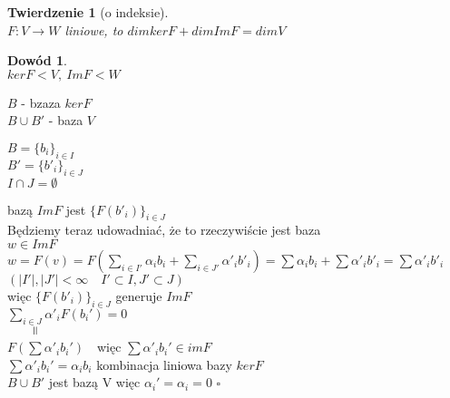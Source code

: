 \documentclass[12pt,a4paper]{article}
\renewcommand{\qed}{$\square$}
\theoremstyle{plain}
\newtheorem{tw}{Twierdzenie}[section]
\theoremstyle{definition}
\theoremstyle{definition}
\theoremstyle{definition}
\theoremstyle{definition}
\newtheorem*{dd}{Dowód}
\theoremstyle{definition}
\theoremstyle{definition}
\theoremstyle{definition}
\theoremstyle{definition}
\theoremstyle{definition}
\begin{document}
\begin{tw}[o indeksie]
    ~\\
    $F: V \rightarrow W $ liniowe, to $dimker F + dimIm F = dim V$
\end{tw}
\newpage
\begin{dd}
    ~\\
    $ker F < V,\  Im F < W$ \\
    \begin{minipage}[c]{0.5\textwidth}
        $B$ - bzaza $ker F$ \\
        $ B \cup B' $ - baza $V$
    \end{minipage}%
    \begin{minipage}[c]{0.5\textwidth}
        $B = \{b_i\}_{i \in I}$ \\
        $B' = \{b'_i\}_{i \in J}$ \\
        $I \cap J = \emptyset $
    \end{minipage}
    bazą $Im F$ jest $\{F(b'_i)\}_{i \in J}$ \\
    Będziemy teraz udowadniać, że to rzeczywiście jest baza\\
    $w \in Im F$ \\
    $w = F(v) = F(\sum\limits_{i \in I'} \alpha_i b_i + \sum\limits_{i \in J'} \alpha'_i b'_i) = \sum\alpha_i b_i + \sum\alpha'_i b'_i = \sum\alpha'_i b'_i $\\
    $(|I'|, |J'|<\infty \quad I'\subset I, J'\subset J)$\\
    więc $\{F(b'_i)\}_{i \in J} $ generuje $ImF$ \\
    $\sum\limits_{i\in J} \alpha'_i F(b_i') = 0$\\
    $\qquad \rotatebox{90}{$\,=$}$\\%
    $F(\sum \alpha'_i b_i') \quad $więc $ \sum \alpha'_i b_i' \in imF$\\
    $\sum \alpha'_i b_i' =\alpha_i b_i$ \quad kombinacja liniowa bazy $kerF$\\
    $B\cup B'$ jest bazą V więc $\alpha_i' = \alpha_i = 0$ \quad \qed
\end{dd} 
\end{document}
